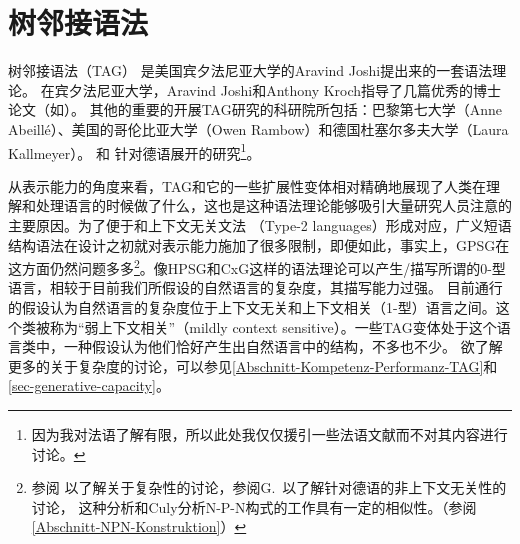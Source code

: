 
\chapter{树邻接语法}
\label{Kapitel-TAG}

\newcommand{\dotted}[0]{\makedash{2pt}}
\newcommand{\g}[1]{{\footnotesize $#1$}}

树邻接语法（TAG）
是美国宾夕法尼亚大学的Aravind Joshi提出来的一套语法理论\citep*{JLT75a-u}。
在宾夕法尼亚大学，Aravind Joshi和Anthony Kroch指导了几篇优秀的博士论文（如\citealp{Rambow94a}）。
其他的重要的开展TAG研究的科研院所包括：巴黎第七大学（Anne Abeill\'{e}）、美国的哥伦比亚大学（Owen Rambow）和德国杜塞尔多夫大学（Laura Kallmeyer）。
 和 针对德语展开的研究\footnote{%
  因为我对法语了解有限，所以此处我仅仅援引一些法语文献而不对其内容进行讨论。
}。

从表示能力的角度来看，TAG和它的一些扩展性变体相对精确地展现了人类在理解和处理语言的时候做了什么，这也是这种语法理论能够吸引大量研究人员注意的主要原因。为了便于和上下文无关文法
（Type-2 languages）形成对应，广义短语结构语法\indexgpsgc 在设计之初就对表示能力施加了很多限制，即便如此，事实上，GPSG在这方面仍然问题多多\citep{Shieber85a,Culy85a}\footnote{%
  参阅 \citet{Pullum86a}以了解关于复杂性的讨论，参阅G.\  以了解针对德语的非上下文无关性的讨论，
  这种分析和Culy分析N-P-N构式的工作具有一定的相似性。（参阅\ref{Abschnitt-NPN-Konstruktion}）%
   }。像HPSG\indexhpsgc 和CxG\indexcxgc 这样的语法理论可以产生/描写所谓的0-型语言，相较于目前我们所假设的自然语言的复杂度，其描写能力过强。
目前通行的假设认为自然语言的复杂度位于上下文无关和上下文相关（1-型）语言之间。这个类被称为“弱上下文相关”（mildly context sensitive）。一些TAG变体处于这个语言类中，一种假设认为他们恰好产生出自然语言中的结构，不多也不少。
欲了解更多的关于复杂度的讨论，可以参见\ref{Abschnitt-Kompetenz-Performanz-TAG}和\ref{sec-generative-capacity}。

